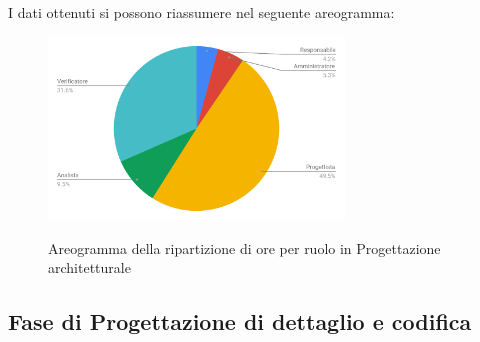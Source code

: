 I dati ottenuti si possono riassumere nel seguente areogramma:
\begin{figure}[H] 
			\centering 
				\includegraphics[width=0.7\textwidth]{res/images/areogramma_architetturale.pdf}\\
				\caption{Areogramma della ripartizione di ore per ruolo in Progettazione architetturale}
			\label{AreogrammaArchitetturale}
\end{figure}

\subsection{Fase di Progettazione di dettaglio e codifica}
